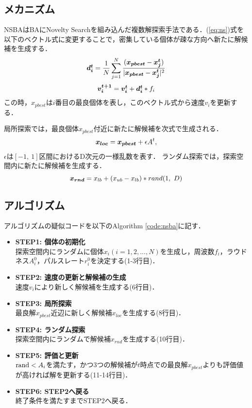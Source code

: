 \documentclass[a4j,11pt]{jarticle}
\begin{document}
\subsection{メカニズム}
\label{ss:NSBA-abst}
NSBAはBAにNovelty Searchを組み込んだ複数解探索手法である．(\ref{eq:ns})式を以下のベクトル式に変更することで，密集している個体が疎な方向へ新たに解候補を生成する．
\begin{equation}
\mbox{\boldmath $d_i^{t}$} = \frac {1}{N} \sum _{j=1}^N \frac {(\mbox{\boldmath $x_{pbest}$}-\mbox{\boldmath $x_j^{t}$})}{|\mbox{\boldmath $x_{pbest}$}-\mbox{\boldmath $x_j^{t}$}|^2}
\label{eq:nd*}
\end{equation}
\begin{equation}
\mbox{\boldmath $v_i^{t+1}$}=\mbox{\boldmath $v_i^{t}$}+\mbox{\boldmath $d_i^{t}$}*f_i
\label{eq:nsvi}
\end{equation}
この時，$x_{pbest}$は$i$番目の最良個体を表し，このベクトル式から速度$v_i$を更新する．

局所探索では，最良個体$x_{pbest}$付近に新たに解候補を次式で生成される．
\begin{equation}
\mbox{\boldmath $x_{loc}$}=\mbox{\boldmath $x_{pbest}$} + \epsilon A^t,
\label{eq:ns_xloc}
\end{equation}
$\epsilon$は$[-1, \ 1]$区間におけるD次元の一様乱数を表す．
ランダム探索では，探索空間内に新たに解候補を生成する．
\begin{equation}
\mbox{\boldmath $x_{rnd}$} = x_{lb} + (x_{ub} - x_{lb})* rand(1, \ D)
\label{eq:ns_rnd}
\end{equation}

\subsection{アルゴリズム}
\label{ss:NSBA-algorithm}
アルゴリズムの疑似コードを以下のAlgorithm \ref{code:nsba}に記す．

\begin{itemize}
\item {\bf STEP1: 個体の初期化}\\
探索空間内にランダムに個体$x_i (i=1,2,...,N)$を生成し，周波数$f_i$，ラウドネス$A_i^0$，パルスレート$r_i^0$を決定する(1-3行目)．
\item {\bf STEP2: 速度の更新と解候補の生成}\\
速度$v_i$により新しく解候補を生成する(6行目)．
\item {\bf STEP3: 局所探索}\\
最良解$x_{pbest}$近辺に新しく解候補$x_{loc}$を生成する(8行目)．
\item {\bf STEP4: ランダム探索}\\
探索空間内にランダムで解候補$x_{rnd}$を生成する(10行目)．
\item {\bf STEP5: 評価と更新}\\
${\rm rand} < A_i$を満たす，かつ3つの解候補が$t$時点での最良解$x_{pbest}$よりも評価値が高ければ解を更新する(11-14行目)．
\item {\bf STEP6: STEP2へ戻る}\\
終了条件を満たすまでSTEP2へ戻る．
\end{itemize}
\end{document}
